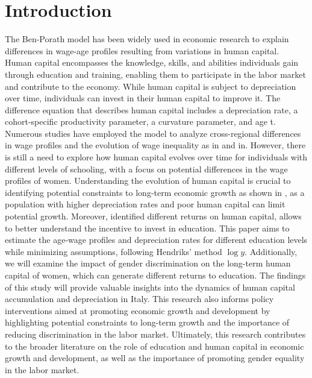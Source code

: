 \documentclass[12pt]{article}
\begin{document}
\section{Introduction}
The Ben-Porath model has been widely used in economic research to explain differences in wage-age profiles resulting
from variations in human capital. Human capital encompasses the knowledge, skills, and abilities individuals gain
through education and training, enabling them to participate in the labor market and contribute to the economy. While
human capital is subject to depreciation over time, individuals can invest in their human capital to improve it. The
difference equation that describes human capital includes a depreciation rate, a cohort-specific productivity parameter,
a curvature parameter, and age t.
\newline
Numerous studies have employed the model\citet{ben1967production} to analyze cross-regional differences in wage profiles
\citet{baker1997human} and the evolution of wage inequality as in \citet{joshi2021gender} and in\citet{erosa2012human}.
However, there is still a need to explore how human capital evolves over time for individuals with different levels of
schooling, with a focus on potential differences in the wage profiles of women. Understanding the evolution of human
capital is crucial to identifying potential constraints to long-term economic growth as shown in \cite{mincer1981human},
as a population with higher depreciation rates and poor human capital can limit potential growth. Moreover, identified
different returns on human capital, allows to better understand the incentive to invest in education.
\newline
This paper aims to estimate the age-wage profiles and depreciation rates for different education levels while minimizing
assumptions, following Hendriks\cite{hendricks2013ben}' method $\log{y}$. Additionally, we will examine the impact of
gender discrimination on the long-term human capital of women, which can generate different returns to education. The
findings of this study will provide valuable insights into the dynamics of human capital accumulation and depreciation
in Italy. This research also informs policy interventions aimed at promoting economic growth and development by
highlighting potential constraints to long-term growth and the importance of reducing discrimination in the labor
market.
\newline
Ultimately, this research contributes to the broader literature on the role of education and human capital in economic
growth and development, as well as the importance of promoting gender equality in the labor market.
\end{document}
